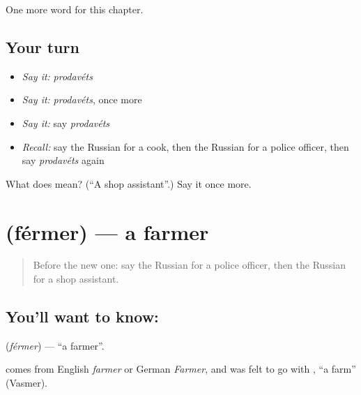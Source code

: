 \begin{grammarlens}[title={What you've built}]
One more word for this chapter.
\end{grammarlens}

\subsection*{Your turn}
\begin{itemize}
\raggedright
  \item \emph{Say it:} \emph{prodavéts}
  \item \emph{Say it:} \emph{prodavéts}, once more
  \item \emph{Say it:} say \emph{prodavéts}
  \item \emph{Recall:} say the Russian for a cook, then the Russian for a police officer, then say \emph{prodavéts} again
\end{itemize}

\begin{tcolorbox}[breakable,colback=teal!4,colframe=teal!35!black,title={Before you move on}]
What does  mean? (\textquotedblleft{}A shop assistant\textquotedblright{}.) Say it once more.
\end{tcolorbox}
\section[\texorpdfstring{\ru{фермер} (férmer)}{фермер (férmer)}]{ (férmer) — a farmer}

\label{lesson:RU-C108-farmer}



\begin{quote}
Before the new one: say the Russian for a police officer, then the Russian for a shop assistant.
\end{quote}

\subsection*{You'll want to know: }
\textbf{} (\emph{férmer}) — \textquotedblleft{}a farmer\textquotedblright{}.

\begin{cousinweb}
\textbf{} comes from English \emph{farmer} or German \emph{Farmer}, and was felt to go with \emph{}, \textquotedblleft{}a farm\textquotedblright{} (Vasmer).
\end{cousinweb}

